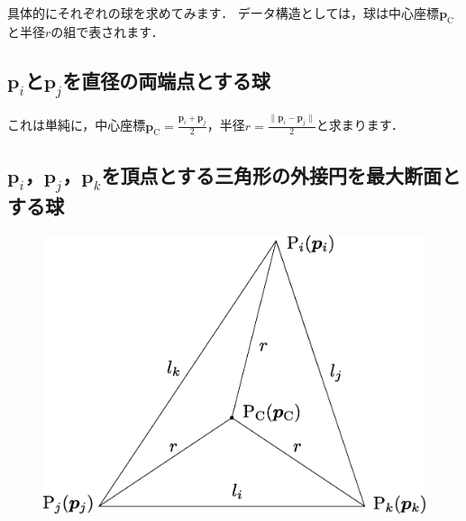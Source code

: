 ﻿\documentclass[a4paper]{jsarticle}
\begin{document}
具体的にそれぞれの球を求めてみます．
データ構造としては，球は中心座標$\boldsymbol{p}_{\mathrm{C}}$と半径$r$の組で表されます．

\subsection{$\boldsymbol{p}_{i}$と$\boldsymbol{p}_{j}$を直径の両端点とする球}

これは単純に，中心座標$\boldsymbol{p}_{\mathrm{C}}=\frac{\displaystyle\boldsymbol{p}_{i}+\boldsymbol{p}_{j}}{\displaystyle 2}$，半径$r=\frac{\displaystyle \|\boldsymbol{p}_{i}-\boldsymbol{p}_{j}\|}{\displaystyle 2}$と求まります．

\subsection{$\boldsymbol{p}_{i}$，$\boldsymbol{p}_{j}$，$\boldsymbol{p}_{k}$を頂点とする三角形の外接円を最大断面とする球}

\begin{figure}[h]
\centering
\includegraphics[width=.6\textwidth]{fig/circumcenter_triangle.eps}
\end{figure}
\end{document}
